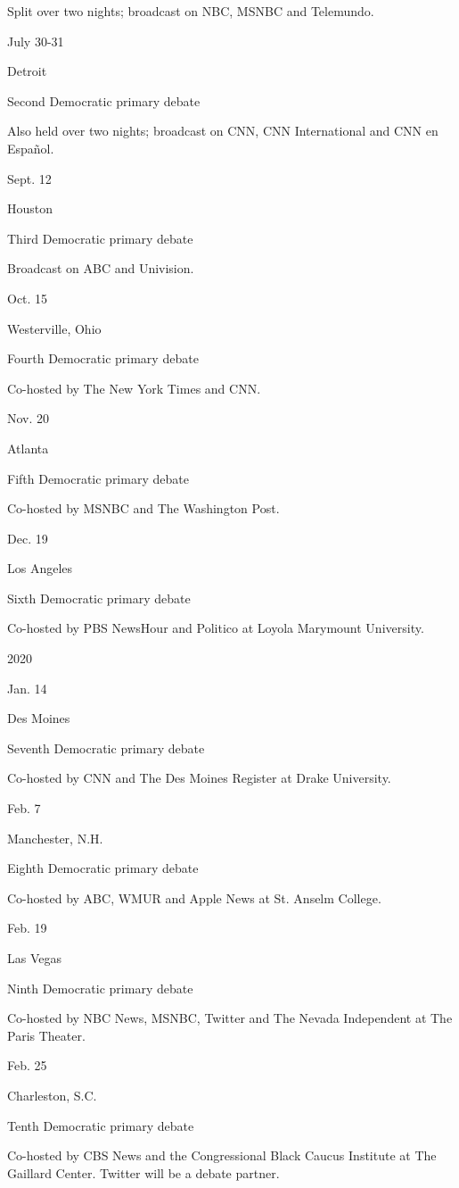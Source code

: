 Split over two nights; broadcast on NBC, MSNBC and Telemundo.

July 30-31

Detroit

Second Democratic primary debate

Also held over two nights; broadcast on CNN, CNN International and CNN
en Español.

Sept. 12

Houston

Third Democratic primary debate

Broadcast on ABC and Univision.

Oct. 15

Westerville, Ohio

Fourth Democratic primary debate

Co-hosted by The New York Times and CNN.

Nov. 20

Atlanta

Fifth Democratic primary debate

Co-hosted by MSNBC and The Washington Post.

Dec. 19

Los Angeles

Sixth Democratic primary debate

Co-hosted by PBS NewsHour and Politico at Loyola Marymount University.

2020

Jan. 14

Des Moines

Seventh Democratic primary debate

Co-hosted by CNN and The Des Moines Register at Drake University.

Feb. 7

Manchester, N.H.

Eighth Democratic primary debate

Co-hosted by ABC, WMUR and Apple News at St. Anselm College.

Feb. 19

Las Vegas

Ninth Democratic primary debate

Co-hosted by NBC News, MSNBC, Twitter and The Nevada Independent at The
Paris Theater.

Feb. 25

Charleston, S.C.

Tenth Democratic primary debate

Co-hosted by CBS News and the Congressional Black Caucus Institute at
The Gaillard Center. Twitter will be a debate partner.

